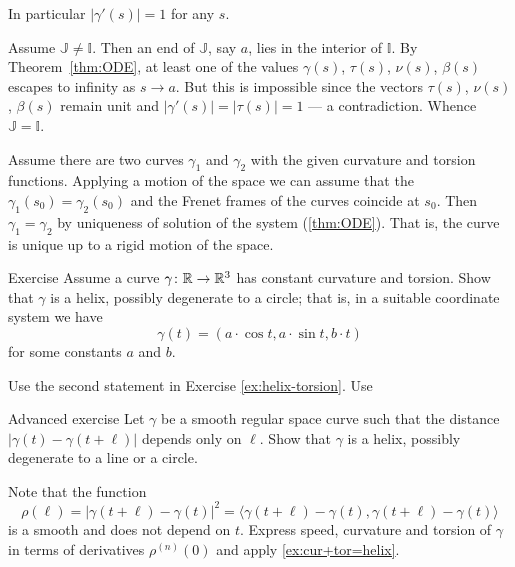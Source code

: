 In particular $|\gamma'(s)|=1$ for any $s$.

Assume $\mathbb{J}\ne \mathbb{I}$.
Then an end of $\mathbb{J}$, say $a$, lies in the interior of $\mathbb{I}$.
By Theorem~\ref{thm:ODE}, at least one of the values $\gamma(s)$, $\tau(s)$, $\nu(s)$, $\beta(s)$
escapes to infinity as $s\to a$.
But this is impossible since the vectors $\tau(s)$, $\nu(s)$, $\beta(s)$ remain unit and $|\gamma'(s)|=|\tau(s)|=1$ --- a contradiction.
Whence $\mathbb{J}= \mathbb{I}$.

Assume there are two curves $\gamma_1$ and $\gamma_2$ with the given curvature and torsion functions.
Applying a motion of the space we can assume that the $\gamma_1(s_0)=\gamma_2(s_0)$ and the Frenet frames of the curves coincide at $s_0$.
Then $\gamma_1=\gamma_2$ by uniqueness of solution of the system (\ref{thm:ODE}).
That is, the curve is unique up to a rigid motion of the space.
\qeds

\begin{thm}{Exercise}\label{ex:cur+tor=helix}
Assume a curve $\gamma\colon\mathbb{R}\to\mathbb{R}^3$ has constant curvature and torsion.
Show that $\gamma$ is a helix, possibly degenerate to a circle;
that is, in a suitable coordinate system we have
\[\gamma(t)=(a\cdot \cos t,a\cdot\sin t, b\cdot t)\]
for some constants $a$ and $b$.
\end{thm}

 Use the second statement in Exercise \ref{ex:helix-torsion}.
Use 


\begin{thm}{Advanced exercise}
Let $\gamma$ be a smooth regular space curve such that the distance $|\gamma(t)-\gamma(t+\ell)|$ depends only on $\ell$.
Show that $\gamma$ is a helix, possibly degenerate to a line or a circle.
\end{thm}

 Note that the function
\[\rho(\ell)=|\gamma(t+\ell)-\gamma(t)|^2=\langle \gamma(t+\ell)-\gamma(t),\gamma(t+\ell)-\gamma(t)\rangle\] 
is a smooth and does not depend on $t$.
Express speed, curvature and torsion of $\gamma$ in terms of derivatives $\rho^{(n)}(0)$
and apply \ref{ex:cur+tor=helix}.
